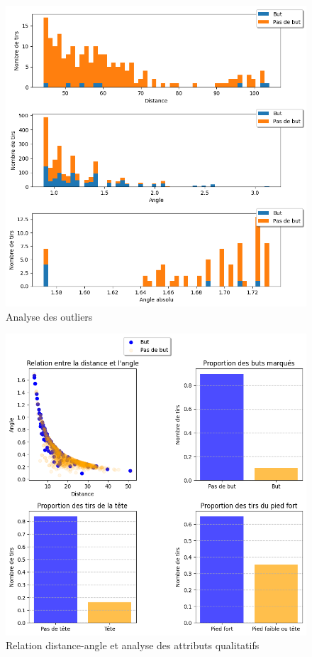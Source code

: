 \documentclass[12pt]{article}
\begin{document}
\begin{figure}[htp]
    \centering
    \includegraphics[width=\textwidth]{img/analyseOutlier2.png}
    \caption{Analyse des outliers}
    \label{fig:analyse_outlier2}
\end{figure}
\begin{figure}[htp]
    \centering
    \includegraphics[width=\textwidth]{img/visualisation_discret.png}
    \caption{Relation distance-angle et analyse des attributs qualitatifs}
    \label{fig:analyse_qualitative}
\end{figure}
\end{document}
